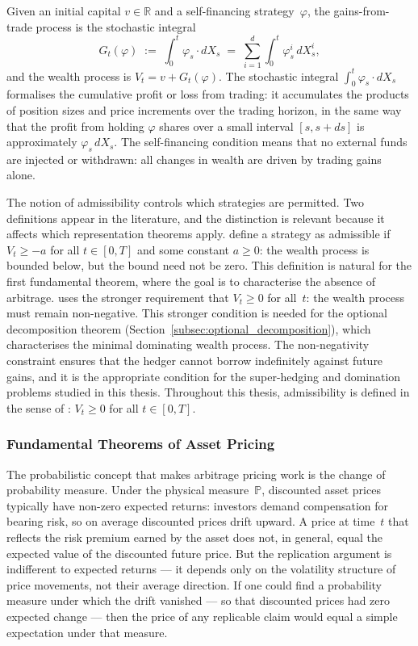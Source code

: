 Given an initial capital $v \in \mathbb{R}$ and a self-financing
strategy~$\varphi$, the gains-from-trade process is the stochastic
integral
\begin{equation}
\label{eq:gains_from_trade}
G_t(\varphi)
\;:=\; \int_0^t \varphi_s \cdot dX_s
\;=\; \sum_{i=1}^{d} \int_0^t \varphi^i_s \, dX^i_s,
\end{equation}
and the wealth process is $V_t = v + G_t(\varphi)$.  The stochastic
integral $\int_0^t \varphi_s \cdot dX_s$ formalises the cumulative
profit or loss from trading: it accumulates the products of position sizes
and price increments over the trading horizon, in the same way that the
profit from holding $\varphi$ shares over a small interval $[s, s+ds]$ is
approximately $\varphi_s \, dX_s$.  The self-financing condition means
that no external funds are injected or withdrawn: all changes in wealth
are driven by trading gains alone.

The notion of admissibility controls which strategies are permitted.  Two
definitions appear in the literature, and the distinction is relevant
because it affects which representation theorems apply.
\citet{DelbaenSchachermayer1994} define a strategy as admissible if
$V_t \ge -a$ for all $t \in [0,T]$ and some constant $a \ge 0$: the
wealth process is bounded below, but the bound need not be zero.  This
definition is natural for the first fundamental theorem, where the goal is
to characterise the absence of arbitrage.  \citet{Kramkov1996} uses the
stronger requirement that $V_t \ge 0$ for all~$t$: the wealth process
must remain non-negative.  This stronger condition is needed for the
optional decomposition theorem
(Section~\ref{subsec:optional_decomposition}), which characterises the
minimal dominating wealth process.  The non-negativity constraint ensures
that the hedger cannot borrow indefinitely against future gains, and it is
the appropriate condition for the super-hedging and domination problems
studied in this thesis.  Throughout this thesis, admissibility is defined
in the sense of \citet{Kramkov1996}: $V_t \ge 0$ for all $t \in [0,T]$.


\subsubsection{Fundamental Theorems of Asset Pricing}
\label{sssec:FTAP}

The probabilistic concept that makes arbitrage pricing work is the change
of probability measure.  Under the physical measure~$\mathbb{P}$,
discounted asset prices typically have non-zero expected returns: investors
demand compensation for bearing risk, so on average discounted prices
drift upward.  A price at time~$t$ that reflects the risk premium earned
by the asset does not, in general, equal the expected value of the
discounted future price.  But the replication argument is indifferent to
expected returns --- it depends only on the volatility structure of price
movements, not their average direction.  If one could find a probability
measure under which the drift vanished --- so that discounted prices had
zero expected change --- then the price of any replicable claim would
equal a simple expectation under that measure.

